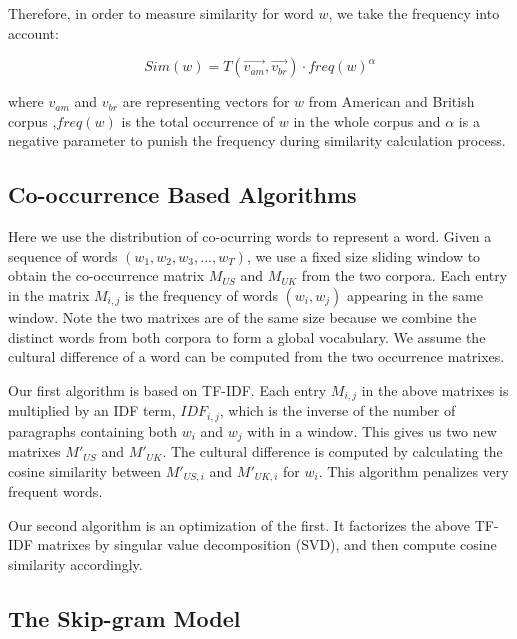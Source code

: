 Therefore, in order to measure similarity for word $w$, we take the frequency into account:

\begin{equation*}
    Sim(w) = T(\overrightarrow{v_{am}}, \overrightarrow{v_{br}}) \cdot freq(w)^{\alpha}
\end{equation*}

where $v_{am}$ and $v_{br}$ are representing vectors for $w$ from American and British corpus 
,$freq(w)$ is the total occurrence of $w$ in the whole corpus and $\alpha$ is a negative parameter
to punish the frequency during similarity calculation process.
 
\subsection{Co-occurrence Based Algorithms}
Here we use the distribution of co-ocurring words to represent a word.
Given a sequence of words $(w_1, w_2, w_3,...,w_T)$, we use a fixed size
sliding window to obtain the co-occurrence matrix $M_{US}$ and $M_{UK}$
from the two corpora. Each entry in the matrix $M_{i, j}$ is the frequency
of words $(w_i, w_j)$ appearing in the same window. Note the two matrixes
are of the same size because we combine the distinct words from both corpora
to form a global vocabulary.  We assume the cultural difference of a word
can be computed from the two occurrence matrixes.

Our first algorithm is based on TF-IDF. Each entry $M_{i, j}$
in the above matrixes is multiplied by an IDF term, $IDF_{i, j}$, which
is the inverse of the number of paragraphs containing
both $w_i$ and $w_j$ with in a window. This gives us two new
matrixes $M'_{US}$ and $M'_{UK}$. The cultural difference is computed by
calculating the cosine similarity between $M'_{US, i}$ and $M'_{UK, i}$
for $w_i$. This algorithm penalizes very frequent words.

Our second algorithm is an optimization of the first. It factorizes the
above TF-IDF matrixes by singular value decomposition (SVD), and then compute
cosine similarity accordingly.

\subsection{The Skip-gram Model}


